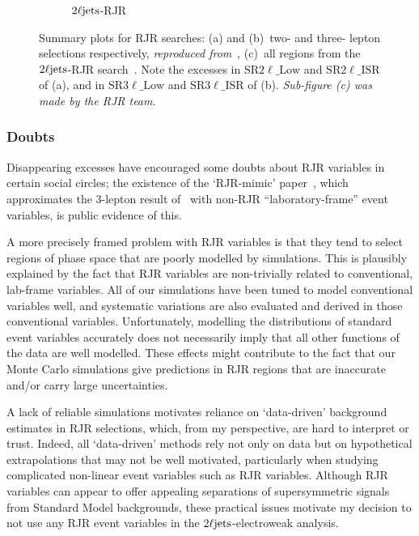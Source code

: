 \begin{figure}[tp]
\begin{subfigure}{0.9\textwidth}
\caption{$2\ell\mathrm{jets}$-RJR~\cite{atlas2022searches}}
\label{fig:2ljets_rjr_summaries_2ljets}
\end{subfigure}
\caption[
Summary plots for RJR searches
]{%
Summary plots for RJR searches:
(a) and (b)~two- and three- lepton selections respectively,
\emph{reproduced from}~\cite{atlas_rjr_23l_SUSY_2017_03},
(c)~all regions from the $2\ell\mathrm{jets}$-RJR search~\cite{atlas2022searches}.
Note the excesses in
$\mathrm{SR}2\ell\_\mathrm{Low}$ and $\mathrm{SR}2\ell\_\mathrm{ISR}$ of (a),
and in
$\mathrm{SR}3\ell\_\mathrm{Low}$ and $\mathrm{SR}3\ell\_\mathrm{ISR}$ of (b).
\emph{Sub-figure (c) was made by the RJR team.}
}
\label{fig:2ljets_rjr_summaries}
\end{figure}


\subsubsection{Doubts}
Disappearing excesses have encouraged some doubts about RJR variables in
certain social circles;
the existence of the `RJR-mimic' paper~\cite{atlas_rjr_mimic_SUSY_2018_06},
which approximates the $3$-lepton result of~\cite{atlas_rjr_23l_SUSY_2017_03}
with non-RJR ``laboratory-frame'' event variables,
is public evidence of this.

A more precisely framed problem with RJR variables is that they tend to select
regions of phase space that are poorly modelled by simulations.
This is plausibly explained by the fact that RJR variables are non-trivially
related to conventional, lab-frame variables.
All of our simulations have been tuned to model conventional variables well,
and systematic variations are also evaluated and derived in those conventional
variables.
Unfortunately, modelling the distributions of standard event variables
accurately does not necessarily imply that all other functions of the data are
well modelled.
These effects might contribute to the fact that our Monte Carlo simulations
give predictions in RJR regions that are inaccurate and/or carry large
uncertainties.

A lack of reliable simulations motivates reliance on `data-driven' background
estimates in RJR selections, which, from my perspective, are hard to interpret
or trust.
Indeed,  all `data-driven' methods rely not only on data but on
hypothetical extrapolations that may not be well motivated, particularly when
studying complicated non-linear event variables such as RJR variables.
Although RJR variables can appear to offer appealing separations of
supersymmetric signals from Standard Model backgrounds, these practical issues
motivate my decision to not use any RJR event variables in the
$2\ell\mathrm{jets}$-electroweak analysis.


